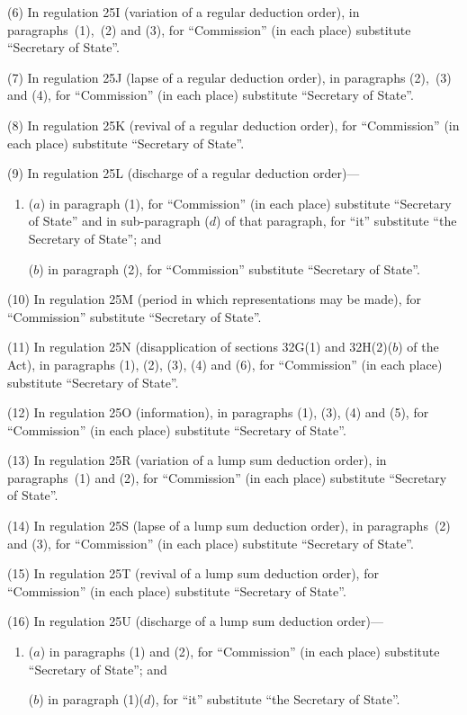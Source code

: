 \documentclass[12pt,a4paper]{article}
\begin{document}
\begin{sloppypar}
(6) In regulation 25I (variation of a regular deduction order), in paragraphs~(1),~(2) and (3), for “Commission” (in each place) substitute “Secretary of State”.
\end{sloppypar}

(7) In regulation 25J (lapse of a regular deduction order), in paragraphs (2),~(3) and (4), for “Commission” (in each place) substitute “Secretary of State”.

(8) In regulation 25K (revival of a regular deduction order), for “Commission” (in each place) substitute “Secretary of State”.

(9) In regulation 25L (discharge of a regular deduction order)—
\begin{enumerate}\item[]
($a$) in paragraph (1), for “Commission” (in each place) substitute “Secretary of State” and in sub-paragraph ($d$)  of that paragraph, for “it” substitute “the Secretary of State”; and

($b$) in paragraph (2), for “Commission” substitute “Secretary of State”.
\end{enumerate}

(10) In regulation 25M (period in which representations may be made), for “Commission” substitute “Secretary of State”.

(11) In regulation 25N (disapplication of sections 32G(1) and 32H(2)($b$)  of the Act), in paragraphs (1), (2), (3), (4) and (6), for “Commission” (in each place) substitute “Secretary of State”.

(12) In regulation 25O (information), in paragraphs (1), (3), (4) and (5), for “Commission” (in each place) substitute “Secretary of State”.

(13) In regulation 25R (variation of a lump sum deduction order), in paragraphs~(1) and (2), for “Commission” (in each place) substitute “Secretary of State”.

(14) In regulation 25S (lapse of a lump sum deduction order), in paragraphs~(2) and (3), for “Commission” (in each place) substitute “Secretary of State”.

(15) In regulation 25T (revival of a lump sum deduction order), for “Commission” (in each place) substitute “Secretary of State”.

(16) In regulation 25U (discharge of a lump sum deduction order)—
\begin{enumerate}\item[]
($a$) in paragraphs (1) and (2), for “Commission” (in each place) substitute “Secretary of State”; and

($b$) in paragraph (1)($d$), for “it” substitute “the Secretary of State”.
\end{enumerate}
\end{document}
